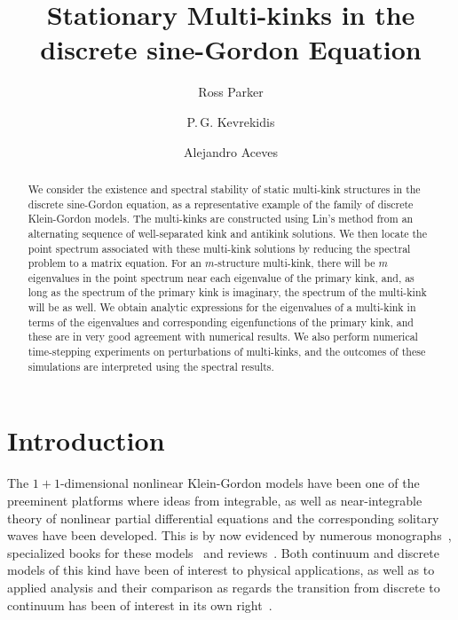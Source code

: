 \documentclass[12pt,reqno]{amsart}
\begin{document}
\title{Stationary Multi-kinks in the discrete sine-Gordon Equation}

\author{Ross Parker}
\address{Department of Mathematics, Southern Methodist University, 
Dallas, TX 75275, USA}

\author{P.\,G. Kevrekidis} 
\address{Department of Mathematics and Statistics, University of Massachusetts, Amherst MA 01003, USA}

\author{Alejandro Aceves}
\address{Department of Mathematics, Southern Methodist University, 
Dallas, TX 75275, USA}

\begin{abstract}
	We consider the existence and spectral stability of static multi-kink structures in the discrete sine-Gordon equation, as
	a representative example of the family of discrete Klein-Gordon
	models. The multi-kinks are constructed using Lin's method from an alternating sequence of well-separated kink and antikink solutions. We then locate the point spectrum associated with these multi-kink solutions by reducing the spectral problem to a matrix equation. For an $m$-structure multi-kink, there will be $m$ eigenvalues in the point spectrum near each eigenvalue of the primary kink, and, as long as the spectrum of the primary kink is imaginary, the spectrum of the multi-kink will be as well. We obtain analytic expressions for the eigenvalues of a multi-kink in terms of the eigenvalues and corresponding eigenfunctions of the primary kink, and these are in very good agreement with numerical results. We also perform numerical time-stepping experiments on perturbations of multi-kinks, and the outcomes of these simulations are interpreted using the spectral results.
\end{abstract}

\maketitle

\section{Introduction}

The $1+1$-dimensional nonlinear Klein-Gordon
models have been one of the preeminent platforms 
where ideas from integrable, as well as near-integrable 
theory of nonlinear
partial differential equations and the corresponding 
solitary waves have been developed. This
is by now evidenced by numerous monographs~\cite{eilbeck,dauxois},
specialized books for these models~\cite{braun2004,SGbook,p4book} 
and reviews~\cite{kivsharmalomed,braun1998}.
Both continuum and discrete models of this kind
have been of interest to physical applications, as well
as to applied analysis and their comparison as regards
the transition from discrete to continuum has been
of interest in its own right~\cite{SGchapter}.
\end{document}
